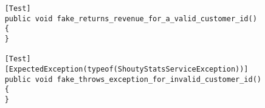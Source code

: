 \begin{verbatim}
    [Test]
    public void fake_returns_revenue_for_a_valid_customer_id()
    {
    }
    
    [Test]
    [ExpectedException(typeof(ShoutyStatsServiceException))]
    public void fake_throws_exception_for_invalid_customer_id()
    {
    }
\end{verbatim}